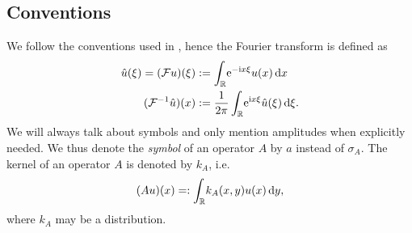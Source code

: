 \subsection{Conventions}
We follow the conventions used in \cite{Les:PDO}, hence the Fourier transform is
defined as
\begin{align*}
  \hat{u}(\xi) = (\mathcal{F}u)(\xi)
    &:= \Integ{\mathbb{R}}{x}{\Eto{-\mathrm ix\xi} u(x)} \\
  (\mathcal{F}^{-1}\hat{u})(x) &:=
  \frac{1}{2\pi}\Integ{\mathbb{R}}{\xi}{\Eto{\mathrm ix\xi}
    \hat{u}(\xi)}.
\end{align*}
We will always talk about symbols and only mention amplitudes when explicitly
needed. We thus denote the \emph{symbol} of an operator $A$ by $a$ instead of
$\sigma_A$. The kernel of an operator $A$ is denoted by $k_A$, i.e.\ 
\begin{align*}
  (Au)(x) =: \Integ{\mathbb{R}}{y}{k_A(x,y) u(x)},
\end{align*}
where $k_A$ may be a distribution.
